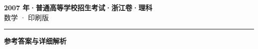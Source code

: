 \documentclass[zihao=5, a4paper]{ctexart}
\begin{document}
\begin{center}
  {\Large\bfseries 2007 年·普通高等学校招生考试·浙江卷·理科}\\[4pt]
  {\large 数学 · 印刷版}
\end{center}
\medskip
{}

\par\bigskip\hrule\bigskip
{}
\begin{center}{\large\bfseries 参考答案与详细解析}\end{center}
\smallskip

\end{document}
